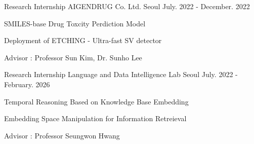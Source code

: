

\begin{cventries}

  \cventry
    {Research Internship} %
    {AIGENDRUG Co. Ltd.} %
    {Seoul} %
    {July. 2022 - December. 2022} %
    {
      \begin{cvitems} %
        \item {SMILES-base Drug Toxcity Perdiction Model}
        \item {Deployment of ETCHING - Ultra-fast SV detector}
        \item {Advisor : Professor Sun Kim, Dr. Sunho Lee}
      \end{cvitems}
    }

  \cventry
    {Research Internship} %
    {Language and Data Intelligence Lab} %
    {Seoul} %
    {July. 2022 - February. 2026} %
    {
      \begin{cvitems} %
        \item {Temporal Reasoning Based on Knowledge Base Embedding}
        \item {Embedding Space Manipulation for Information Retreieval}
        \item {Advisor : Professor Seungwon Hwang}
      \end{cvitems}
    }


\end{cventries}

